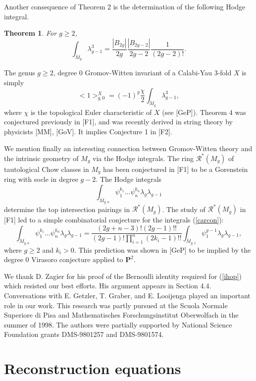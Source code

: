 \documentclass[11 pt]{amsart}
\newtheorem{tm}{Theorem}
\newcommand{\proj}{\mathbf P}
\newcommand{\mgn}{\overline{M}_{g,n}}
\begin{document}
Another consequence of Theorem 2 is the determination
of the following Hodge integral.
\begin{tm} For $g\ge2$,
$$
\int_{\overline{M}_g}\lambda_{g-1}^3=\frac{|B_{2g}|}{2g}
\frac{|B_{2g-2}|}{2g-2}\frac1{(2g-2)!}.
$$
\end{tm}
\noindent The genus $g\geq 2$, degree 0 Gromov-Witten invariant of a
Calabi-Yau 3-fold $X$
is simply 
$$<1>_{g,0}^X= (-1)^g \frac{\chi}{2} \int_{\overline{M}_g} \lambda_{g-1}^3,$$
where $\chi$ is the topological Euler
characteristic of $X$ (see [GeP]).
Theorem 4 was conjectured previously in [F1],
and was recently derived in string theory
by physicists [MM], [GoV].
It implies Conjecture 1 in [F2].


We mention finally an interesting connection between
Gromov-Witten theory and the intrinsic geometry of $M_g$
via the Hodge integrals.
The ring $\mathcal{R}^*(M_g)$ of tautological Chow classes in
$M_g$ has been conjectured in [F1] to be a Gorenstein
ring with socle in degree $g-2$. The Hodge integrals 
\begin{equation}
\label{carcon}
\int_{\overline{M}_{g,n}} 
\psi_1^{k_1} \dots \psi_n^{k_n} \lambda_g \lambda_{g-1}
\end{equation}
determine the top intersection pairings in $\mathcal{R}^*(M_g)$. The study of
$\mathcal{R}^*(M_g)$ in [F1] led to a simple combinatorial conjecture for the
integrals (\ref{carcon}):  
\begin{equation} \label{lamgg}
\int_{\mgn} \psi_1^{k_1} \dots \psi_n^{k_n} \lambda_g \lambda_{g-1}
= \frac{(2g+n-3)! (2g-1)!!}{(2g-1)!\prod_{i=1}^n (2k_i-1)!!}
\int_{\overline{M}_{g,1}} \psi_1^{g-1} \lambda_g \lambda_{g-1},
\end{equation}
where $g\geq 2$ and $k_i>0$.
This prediction 
was shown in [GeP] to be implied by the
degree 0 Virasoro conjecture applied to $\proj^2$. 

\vspace{+10pt}
We thank
D. Zagier
for his proof of the Bernoulli identity 
required for (\ref{ihop})
which
resisted our best efforts. His argument appears in Section 4.4.
Conversations with E. Getzler, T. Graber, and E. Looijenga
played an important role in our work. 
This research was partly pursued at the Scuola Normale Superiore di
Pisa and Mathematisches Forschungsinstitut Oberwolfach in the summer of 1998.
The authors were partially supported by National Science
Foundation grants DMS-9801257 and DMS-9801574.


\section{\bf{Reconstruction equations}}
\end{document}
